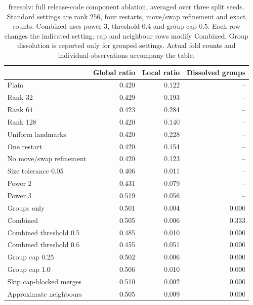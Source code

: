 \begin{table}[htbp]\centering\small
\begin{tabular}{lrrr}
\toprule
 & Global ratio & Local ratio & Dissolved groups \\
\midrule
Plain & 0.420 & 0.122 & -- \\
Rank 32 & 0.429 & 0.193 & -- \\
Rank 64 & 0.423 & 0.284 & -- \\
Rank 128 & 0.420 & 0.140 & -- \\
Uniform landmarks & 0.420 & 0.228 & -- \\
One restart & 0.420 & 0.154 & -- \\
No move/swap refinement & 0.420 & 0.123 & -- \\
Size tolerance 0.05 & 0.406 & 0.011 & -- \\
Power 2 & 0.431 & 0.079 & -- \\
Power 3 & 0.519 & 0.056 & -- \\
Groups only & 0.501 & 0.004 & 0.000 \\
Combined & 0.505 & 0.006 & 0.333 \\
Combined threshold 0.5 & 0.485 & 0.010 & 0.000 \\
Combined threshold 0.6 & 0.455 & 0.051 & 0.000 \\
Group cap 0.25 & 0.502 & 0.006 & 0.000 \\
Group cap 1.0 & 0.506 & 0.010 & 0.000 \\
Skip cap-blocked merges & 0.510 & 0.002 & 0.000 \\
Approximate neighbours & 0.505 & 0.009 & 0.000 \\
\bottomrule
\end{tabular}

\caption{freesolv: full release-code component ablation, averaged over three split seeds. Standard settings are rank 256, four restarts, move/swap refinement and exact counts. Combined uses power 3, threshold 0.4 and group cap 0.5. Each row changes the indicated setting; cap and neighbour rows modify Combined. Group dissolution is reported only for grouped settings. Actual fold counts and individual observations accompany the table.}\end{table}
